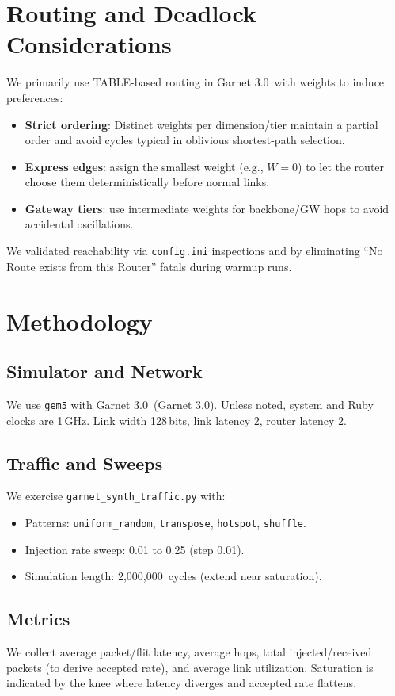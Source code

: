 \documentclass[11pt]{article}
\newcommand{\Ruby}{Garnet 3.0}
\newcommand{\SimCycles}{2{,}000{,}000}
\newcommand{\Clk}{1\,GHz}
\newcommand{\LinkW}{128\,bits}
\newcommand{\LinkLat}{2}              %
\newcommand{\RouterLat}{2}            %
\begin{document}
\section{Routing and Deadlock Considerations}
We primarily use TABLE-based routing in \Ruby\ with weights to induce preferences:
\begin{itemize}[leftmargin=1em]
  \item \textbf{Strict ordering}: Distinct weights per dimension/tier maintain a partial order and avoid cycles typical in oblivious shortest-path selection.
  \item \textbf{Express edges}: assign the smallest weight (e.g., $W{=}0$) to let the router choose them deterministically before normal links.
  \item \textbf{Gateway tiers}: use intermediate weights for backbone/GW hops to avoid accidental oscillations.
\end{itemize}
We validated reachability via \texttt{config.ini} inspections and by eliminating ``No Route exists from this Router'' fatals during warmup runs.

\section{Methodology}
\subsection{Simulator and Network}
We use \texttt{gem5} \cite{gem5} with \Ruby\ (Garnet 3.0). Unless noted, system and Ruby clocks are \Clk. Link width \LinkW, link latency \LinkLat, router latency \RouterLat.

\subsection{Traffic and Sweeps}
We exercise \texttt{garnet\_synth\_traffic.py} with:
\begin{itemize}[leftmargin=1em]
  \item Patterns: \texttt{uniform\_random}, \texttt{transpose}, \texttt{hotspot}, \texttt{shuffle}.
  \item Injection rate sweep: 0.01 to 0.25 (step 0.01).
  \item Simulation length: \SimCycles\ cycles (extend near saturation).
\end{itemize}

\subsection{Metrics}
We collect average packet/flit latency, average hops, total injected/received packets (to derive accepted rate), and average link utilization. Saturation is indicated by the knee where latency diverges and accepted rate flattens.
\end{document}
